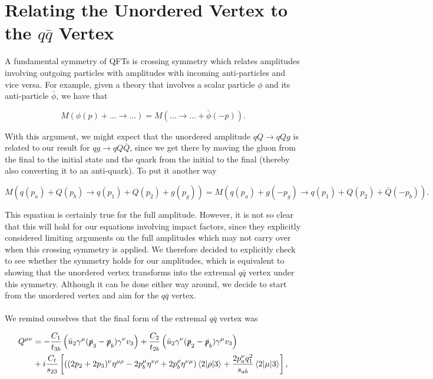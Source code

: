 \chapter{Relating the Unordered Vertex to the $q\bar{q}$ Vertex}
\label{app:crossing}

A fundamental symmetry of QFTs is crossing symmetry which relates amplitudes involving outgoing particles with amplitudes with incoming anti-particles and vice versa. For example, given a theory that involves a scalar particle $\phi$ and its anti-particle $\bar{\phi}$, we have that 

\begin{equation}
M(\phi(p) + \ldots \to \ldots) = M(\ldots \to \ldots + \bar{\phi}(-p)).
\end{equation}

With this argument, we might expect that the unordered amplitude $qQ \to qQg$ is related to our result for $qg \to qQ\bar{Q}$, since we get there by moving the gluon from the final to the initial state and the quark from the initial to the final (thereby also converting it to an anti-quark). To put it another way

\begin{equation}
M(q(p_a) + Q(p_b) \to q(p_1) + Q(p_2) + g(p_g)) = M(q(p_a) + g(-p_g) \to q(p_1) + Q(p_2) + \bar{Q}(-p_b)).
\end{equation}

This equation is certainly true for the full amplitude. However, it is not so clear that this will hold for our equations involving impact factors, since they explicitly considered limiting arguments on the full amplitudes which may not carry over when this crossing symmetry is applied. We therefore decided to explicitly check to see whether the symmetry holds for our amplitudes, which is equivalent to showing that the unordered vertex transforms into the extremal $q\bar{q}$ vertex under this symmetry. Although it can be done either way around, we decide to start from the unordered vertex and aim for the $q\bar{q}$ vertex. \\
\\
We remind ourselves that the final form of the extremal $q\bar{q}$ vertex was 

\begin{equation}
\begin{split}
Q^{\mu \nu} &= -\frac{C_1}{t_{3b}} \left(\bar{u}_2 \gamma^\mu (\slashed{p}_3-\slashed{p}_b)\gamma^\nu v_3 \right) + \frac{C_2}{t_{2b}} \left( \bar{u}_2 \gamma^\nu (\slashed{p}_2-\slashed{p}_b) \gamma^\mu v_3 \right)  \\
&+ i  \frac{C_t}{s_{23}} \left[\left((2p_2+2p_3)^\nu \eta^{\mu \rho} - 2p_b^\mu \eta^{\nu \rho} + 2p_b^\rho \eta^{\nu \mu} \right) \mathinner{\langle2\vert\rho\vert3\rangle}_{} + \frac{2 p_a^\nu q_1^2}{s_{ab}} \mathinner{\langle2\vert\mu\vert3\rangle}_{} \right],
\end{split}
\end{equation}

